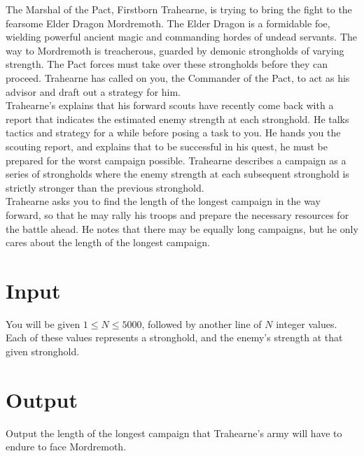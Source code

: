 
The Marshal of the Pact, Firstborn Trahearne, is trying to bring the fight to the fearsome Elder Dragon Mordremoth. The
Elder Dragon is a formidable foe, wielding powerful ancient magic and commanding hordes of undead servants. The way to
Mordremoth is treacherous, guarded by demonic strongholds of varying strength. The Pact forces must take over these
strongholds before they can proceed. Trahearne has called on you, the Commander of the Pact, to act as his advisor and
draft out a strategy for him. \\

Trahearne’s explains that his forward scouts have recently come back with a report that indicates the estimated enemy
strength at each stronghold. He talks tactics and strategy for a while before posing a task to you. He hands you the
scouting report, and explains that to be successful in his quest, he must be prepared for the worst campaign possible.
Trahearne describes a campaign as a series of strongholds where the enemy strength at each subsequent stronghold is
strictly stronger than the previous stronghold. \\

Trahearne asks you to find the length of the longest campaign in the way forward, so that he may rally his troops and
prepare the necessary resources for the battle ahead. He notes that there may be equally long campaigns, but he only
cares about the length of the longest campaign. \\


\section*{Input}
You will be given $1 \leq N \leq 5000$, followed by another line of $N$ integer values. Each of these values represents
a stronghold, and the enemy's strength at that given stronghold.
\section*{Output}
Output the length of the longest campaign that Trahearne’s army will have to endure to face Mordremoth. \\
